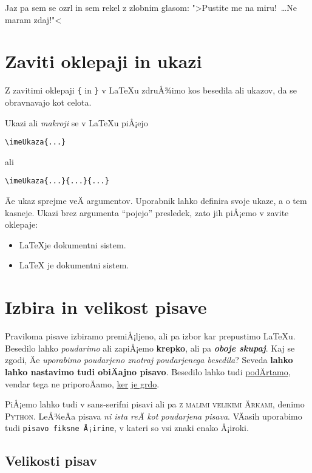 \documentclass[a4paper]{article}
\begin{document}
Jaz pa sem se ozrl in sem rekel z zlobnim glasom: ">Pustite me na miru!~\dots Ne maram zdaj!"<

\section{Zaviti oklepaji in ukazi}

Z zavitimi oklepaji \texttt{\{} in \texttt{\}} v LaTeXu zdruÅ¾imo kos besedila ali ukazov,
da se obravnavajo kot celota.

Ukazi ali \emph{makroji} se v LaTeXu piÅ¡ejo
%
\begin{center}
  \verb|\imeUkaza{...}|
\end{center}
%
ali
%
\begin{center}
  \verb|\imeUkaza{...}{...}{...}|
\end{center}
%
Äe ukaz sprejme veÄ argumentov. Uporabnik lahko definira svoje ukaze, a o tem kasneje.
Ukazi brez argumenta ``pojejo'' presledek, zato jih piÅ¡emo v zavite oklepaje:
%
\begin{itemize}
\item \LaTeX je dokumentni sistem.
\item {\LaTeX} je dokumentni sistem.
\end{itemize}


\section{Izbira in velikost pisave}

Praviloma pisave izbiramo premiÅ¡ljeno, ali pa izbor kar prepustimo LaTeXu.
Besedilo lahko \emph{poudarimo} ali zapiÅ¡emo \textbf{krepko}, ali pa \emph{\textbf{oboje skupaj}}.
Kaj se zgodi, Äe \emph{uporabimo poudarjeno \emph{znotraj} poudarjenega besedila}?
Seveda \textbf{lahko lahko nastavimo tudi \textnormal{obiÄajno} pisavo}.
Besedilo lahko tudi \underline{podÄrtamo}, vendar tega ne priporoÄamo, \underline{ker} \underline{je grdo}.

PiÅ¡emo lahko tudi v \textsf{sans-serifni pisavi} ali pa \textsc{z malimi velikimi Ärkami},
denimo \textsc{Python}. LeÅ¾eÄa pisava \textsl{ni ista reÄ kot} \emph{poudarjena pisava}.
VÄasih uporabimo tudi \texttt{pisavo fiksne Å¡irine}, v kateri so vsi znaki enako Å¡iroki.


\subsection{Velikosti pisav}
\end{document}
